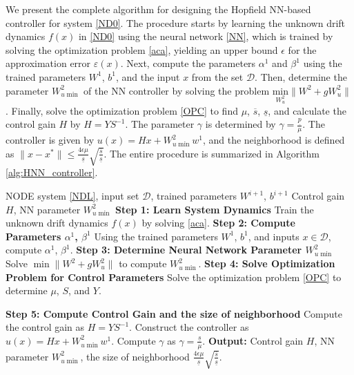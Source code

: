\documentclass[journal,twoside,web]{ieeecolor}
\begin{document}
We present the complete algorithm for designing the Hopfield NN-based controller for system \eqref{ND0}. The procedure starts by learning the unknown drift dynamics $f(x)$ in \eqref{ND0} using the neural network \eqref{NN}, which is trained by solving the optimization problem \eqref{aca}, yielding an upper bound $\epsilon$ for the approximation error $\varepsilon(x)$. Next, compute the parameters $\alpha^1$ and $\beta^1$ using the trained parameters $W^1$, $b^1$, and the input $x$ from the set $\mathcal{D}$. Then, determine the parameter $W_{u\min}^{2}$ of the NN controller by solving the problem $\underset{W_u^{2}}{\text{min}}\|W^2+gW_u^{2}\|$. Finally, solve the optimization problem \eqref{OPC} to find  $\mu$, $\overline{s}$, $\underline{s}$, and calculate the control gain $H$ by $H=YS^{-1}$. The parameter $\gamma$ is determined by $\gamma=\frac{\underline{p}}{\mu}$. The controller is given by $u(x)=Hx+W_{u\min}^{2}w^1$,  and the neighborhood is defined as $\|x-x^*\|\leq \frac{4\epsilon \mu}{\underline{s}}\sqrt{\frac{\overline{s}}{\underline{s}}}$.
The entire procedure is summarized in Algorithm \ref{alg:HNN_controller}.
\begin{algorithm}[H]
\caption{Hopfield Neural Network Based Controller Design}
\label{alg:HNN_controller}
\begin{algorithmic}[1]
\REQUIRE NODE system \eqref{NDL}, input set $\mathcal{D}$, trained parameters $W^{i+1}$, $b^{i+1}$
\ENSURE Control gain $H$, NN parameter $W_{u\min}^{2}$
\vspace{0.5em}
\STATE \textbf{Step 1: Learn System Dynamics}
\STATE Train the unknown drift dynamics $f(x)$ by solving \eqref{aca}.
\vspace{0.5em}
\STATE \textbf{Step 2: Compute Parameters $\alpha^1$, $\beta^1$}
\STATE Using the trained parameters $W^1$, $b^1$, and inputs $x \in \mathcal{D}$, compute $\alpha^1$, $\beta^1$.
\STATE \textbf{Step 3: Determine Neural Network Parameter $W_{u\min}^{2}$}
\STATE Solve $\min \|W^2 +gW_u^{2}\|$ to compute $W_{u\min}^{2}$.
\STATE \textbf{Step 4: Solve Optimization Problem for Control Parameters}
\STATE Solve the optimization problem \eqref{OPC} to determine $\mu$, $S$, and $Y$.

\STATE \textbf{Step 5: Compute Control Gain and the size of neighborhood}
\STATE Compute the control gain as $H = YS^{-1}$.
\STATE Construct the controller as $u(x)=Hx+W_{u\min}^{2}w^1$.
\STATE Compute $\gamma$ as $\gamma=\frac{\underline{s}}{\mu}$.
\STATE \textbf{Output:} Control gain $H$, NN parameter $W_{u\min}^{2}$, the size of neighborhood $\frac{4\epsilon \mu}{\underline{s}}\sqrt{\frac{\overline{s}}{\underline{s}}}$.
\end{algorithmic}
\end{algorithm}
\end{document}
